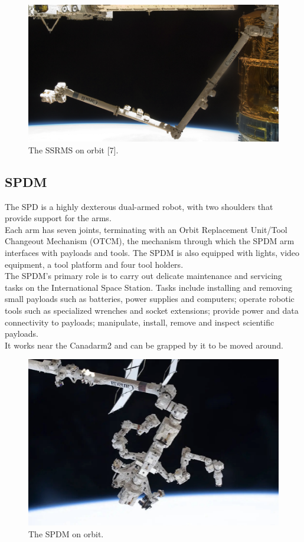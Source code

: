 \documentclass[a4paper,12pt,oneside]{report}
\begin{document}
\begin{figure}[h]
  \centering
  \includegraphics[scale=0.4]{SSRMS_orbit.png}
  \caption{The SSRMS on orbit [7].}
  \label{SSRMS_orbit}
\end{figure}
\subsection{SPDM}
The SPD is a highly dexterous dual-armed robot, with two shoulders that provide support for the arms.\\
Each arm has seven joints, terminating with an Orbit Replacement Unit/Tool Changeout Mechanism (OTCM), the mechanism through which the SPDM arm interfaces with payloads and tools. The SPDM is also equipped with lights, video equipment, a tool platform and four tool holders.\\
The SPDM's primary role is to carry out delicate maintenance and servicing tasks on the International Space Station. Tasks include installing and removing small payloads such as batteries, power supplies and computers; operate robotic tools such as specialized wrenches and socket extensions; provide power and data connectivity to payloads; manipulate, install, remove and inspect scientific payloads.\\
It works near the Canadarm2 and can be grapped by it to be moved around.\\
\begin{figure}[h]
  \centering
  \includegraphics[scale=0.6]{SPDM.png}
  \caption{The SPDM on orbit.}
  \label{SPDM_orbit}
\end{figure}
\end{document}
